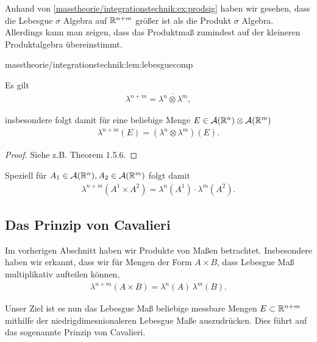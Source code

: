 \par
Anhand von \cref{masstheorie/integrationstechnik:ex:prodsig} haben wir gesehen, dass die Lebesgue \(\sigma\) Algebra auf \(\mathbb{R}^{n+m}\) größer ist als die Produkt \(\sigma\) Algebra. Allerdings kann man zeigen, dass das Produktmaß zumindest auf der kleineren Produktalgebra übereinstimmt.
\begin{lemma}{}{masstheorie/integrationstechnik:lem:lebesguecomp}



\par
Es gilt
\begin{align*}
\lambda^{n+m} = \overline{\lambda^n\otimes\lambda^m},
\end{align*}
\par
insbesondere folgt damit für eine beliebige Menge \(E\in \mathcal{A}(\mathbb{R}^n)\otimes\mathcal{A}(\mathbb{R}^m)\)
\begin{align*}
\lambda^{n+m}(E) = (\lambda^n\otimes\lambda^m)(E).
\end{align*}\end{lemma}

\begin{proof}
 Siehe z.B. \cite{Bog07} Theorem 1.5.6.
\end{proof}

\par
Speziell für \(A_1\in\mathcal{A}(\mathbb{R}^n), A_2\in\mathcal{A}(\mathbb{R}^m)\) folgt damit
\begin{align*}
\lambda^{n+m}(A^1\times A^2)=\lambda^{n}(A^1)\cdot\lambda^{m}(A^2).
\end{align*}

\subsection{Das Prinzip von Cavalieri}
\label{\detokenize{masstheorie/integrationstechnik:das-prinzip-von-cavalieri}}
\par
Im vorherigen Abschnitt haben wir Produkte von Maßen betrachtet. Insbesondere haben wir erkannt, dass wir für Mengen der Form \(A\times B\), dass Lebesgue Maß multiplikativ aufteilen können,
\begin{align*}
\lambda^{n+m}(A\times B) = \lambda^n(A)\,\lambda^m(B).
\end{align*}
\par
Unser Ziel ist es nun das Lebesgue Maß beliebige messbare Mengen \(E\subset\mathbb{R}^{n+m}\) mithilfe der niedrigdimesnionaleren Lebesgue Maße auszudrücken. Dies führt auf das sogenannte Prinzip von Cavalieri.

